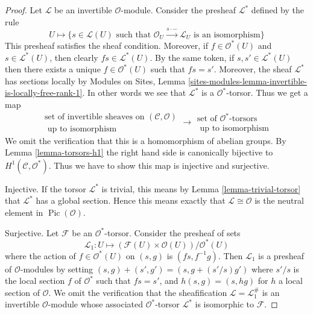 \documentclass[10pt,a4paper]{amsart}
\theoremstyle{plain}
\theoremstyle{definition}
\theoremstyle{remark}
\numberwithin{equation}{subsection}
\def\Pic{\mathop{\mathrm{Pic}}\nolimits}
\begin{document}
\begin{proof}
Let $\mathcal{L}$ be an invertible $\mathcal{O}$-module.
Consider the presheaf $\mathcal{L}^*$ defined by the rule
$$
U \longmapsto \{s \in \mathcal{L}(U)
\text{ such that } \mathcal{O}_U \xrightarrow{s \cdot -} \mathcal{L}_U
\text{ is an isomorphism}\}
$$
This presheaf satisfies the sheaf condition. Moreover, if
$f \in \mathcal{O}^*(U)$ and $s \in \mathcal{L}^*(U)$, then clearly
$fs \in \mathcal{L}^*(U)$. By the same token, if $s, s' \in \mathcal{L}^*(U)$
then there exists a unique $f \in \mathcal{O}^*(U)$ such that
$fs = s'$. Moreover, the sheaf $\mathcal{L}^*$ has sections locally
by Modules on Sites, Lemma
\ref{sites-modules-lemma-invertible-is-locally-free-rank-1}.
In other words we
see that $\mathcal{L}^*$ is a $\mathcal{O}^*$-torsor. Thus we get
a map
$$
\begin{matrix}
\text{set of invertible sheaves on }(\mathcal{C}, \mathcal{O}) \\
\text{ up to isomorphism}
\end{matrix}
\longrightarrow
\begin{matrix}
\text{set of }\mathcal{O}^*\text{-torsors} \\
\text{ up to isomorphism}
\end{matrix}
$$
We omit the verification that this is a homomorphism of abelian groups.
By
Lemma \ref{lemma-torsors-h1}
the right hand side is canonically
bijective to $H^1(\mathcal{C}, \mathcal{O}^*)$.
Thus we have to show this map is injective and surjective.

\medskip\noindent
Injective. If the torsor $\mathcal{L}^*$ is trivial, this means by
Lemma \ref{lemma-trivial-torsor}
that $\mathcal{L}^*$ has a global section.
Hence this means exactly that $\mathcal{L} \cong \mathcal{O}$ is
the neutral element in $\Pic(\mathcal{O})$.

\medskip\noindent
Surjective. Let $\mathcal{F}$ be an $\mathcal{O}^*$-torsor.
Consider the presheaf of sets
$$
\mathcal{L}_1 : U \longmapsto
(\mathcal{F}(U) \times \mathcal{O}(U))/\mathcal{O}^*(U)
$$
where the action of $f \in \mathcal{O}^*(U)$ on
$(s, g)$ is $(fs, f^{-1}g)$. Then $\mathcal{L}_1$ is a presheaf
of $\mathcal{O}$-modules by setting
$(s, g) + (s', g') = (s, g + (s'/s)g')$ where $s'/s$ is the local
section $f$ of $\mathcal{O}^*$ such that $fs = s'$, and
$h(s, g) = (s, hg)$ for $h$ a local section of $\mathcal{O}$.
We omit the verification that the sheafification
$\mathcal{L} = \mathcal{L}_1^\#$ is an invertible $\mathcal{O}$-module
whose associated $\mathcal{O}^*$-torsor $\mathcal{L}^*$ is isomorphic
to $\mathcal{F}$.
\end{proof}
\end{document}
